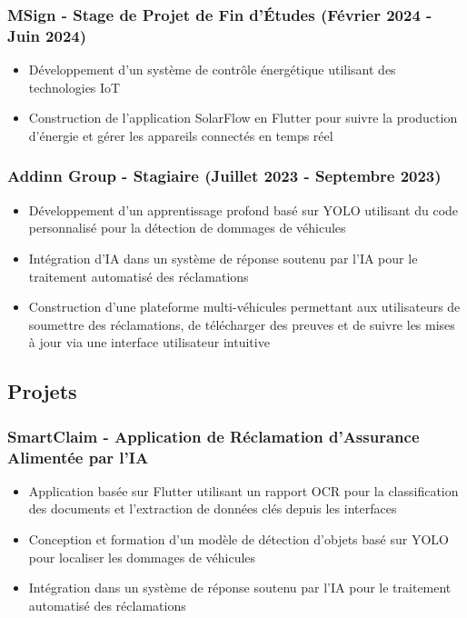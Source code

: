 \documentclass[12pt,a4paper]{article}
\begin{document}
\begin{itemize}
\subsubsection{MSign - Stage de Projet de Fin d'Études (Février 2024 - Juin 2024)}
\begin{itemize}
    \item Développement d'un système de contrôle énergétique utilisant des technologies IoT
    \item Construction de l'application SolarFlow en Flutter pour suivre la production d'énergie et gérer les appareils connectés en temps réel
\end{itemize}

\subsubsection{Addinn Group - Stagiaire (Juillet 2023 - Septembre 2023)}
\begin{itemize}
    \item Développement d'un apprentissage profond basé sur YOLO utilisant du code personnalisé pour la détection de dommages de véhicules
    \item Intégration d'IA dans un système de réponse soutenu par l'IA pour le traitement automatisé des réclamations
    \item Construction d'une plateforme multi-véhicules permettant aux utilisateurs de soumettre des réclamations, de télécharger des preuves et de suivre les mises à jour via une interface utilisateur intuitive
\end{itemize}

\subsection{Projets}

\subsubsection{SmartClaim - Application de Réclamation d'Assurance Alimentée par l'IA}
\begin{itemize}
    \item Application basée sur Flutter utilisant un rapport OCR pour la classification des documents et l'extraction de données clés depuis les interfaces
    \item Conception et formation d'un modèle de détection d'objets basé sur YOLO pour localiser les dommages de véhicules
    \item Intégration dans un système de réponse soutenu par l'IA pour le traitement automatisé des réclamations
\end{itemize}


\end{itemize}
\end{document}
